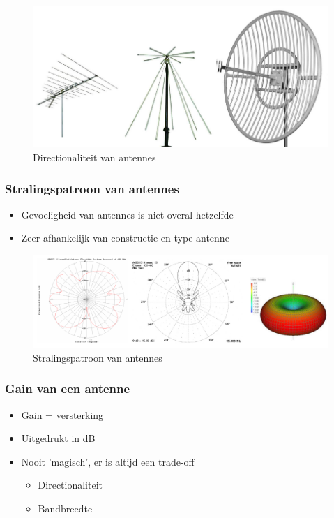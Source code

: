 \documentclass{article}
\begin{document}
\begin{figure}[H]
    \centering
    \includegraphics[width=\textwidth]{Screenshot_20200309_122609.png}
    \caption{Directionaliteit van antennes}
\end{figure}

\subsubsection{Stralingspatroon van antennes}
\begin{itemize}
    \item Gevoeligheid van antennes is niet overal hetzelfde
    \item Zeer afhankelijk van constructie en type antenne
\end{itemize}

\begin{figure}[H]
    \centering
    \includegraphics[width=\textwidth]{Screenshot_20200309_122734.png}
    \caption{Stralingspatroon van antennes}
\end{figure}

\subsubsection{Gain van een antenne}
\begin{itemize}
    \item Gain = versterking
    \item Uitgedrukt in dB
    \item Nooit 'magisch', er is altijd een trade-off
    \begin{itemize}
        \item Directionaliteit
        \item Bandbreedte
    \end{itemize}
\end{itemize}
\end{document}
